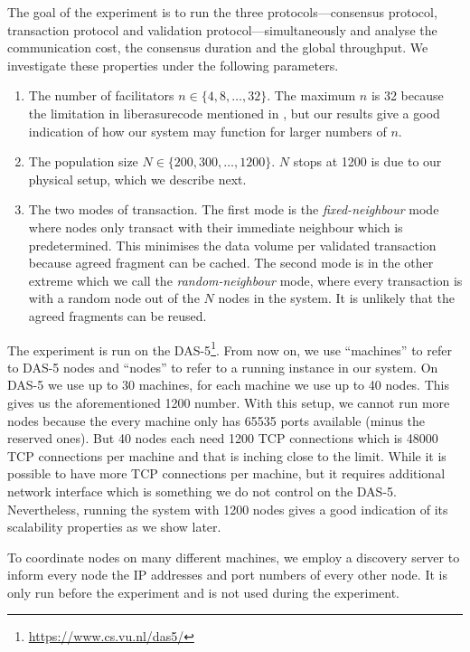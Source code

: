 The goal of the experiment is to run the three protocols---consensus protocol,
transaction protocol and validation protocol---simultaneously and analyse the communication cost, the consensus duration and the global throughput.
We investigate these properties under the following parameters.
\begin{enumerate}
  \item The number of facilitators $n \in \{4, 8, \dots, 32\}$.
        The maximum $n$ is 32 because the limitation in liberasurecode mentioned in ,
        but our results give a good indication of how our system may function for larger numbers of $n$.
  \item The population size $N \in \{200, 300, \dots, 1200\}$.
        $N$ stops at 1200 is due to our physical setup, which we describe next.
  \item The two modes of transaction.
        The first mode is the \emph{fixed-neighbour} mode where nodes only transact with their immediate neighbour which is predetermined. 
        This minimises the data volume per validated transaction because agreed fragment can be cached.
        The second mode is in the other extreme which we call the \emph{random-neighbour} mode,
        where every transaction is with a random node out of the $N$ nodes in the system.
        It is unlikely that the agreed fragments can be reused.
\end{enumerate}

The experiment is run on the DAS-5\footnote{\url{https://www.cs.vu.nl/das5/}}.
From now on, we use ``machines'' to refer to DAS-5 nodes and ``nodes'' to refer to a running instance in our system.
On DAS-5 we use up to 30 machines, for each machine we use up to 40 nodes.
This gives us the aforementioned 1200 number.
With this setup, we cannot run more nodes because the every machine only has 65535 ports available (minus the reserved ones).
But 40 nodes each need 1200 TCP connections which is 48000 TCP connections per machine and that is inching close to the limit.
While it is possible to have more TCP connections per machine,
but it requires additional network interface which is something we do not control on the DAS-5.
Nevertheless, running the system with 1200 nodes gives a good indication of its scalability properties as we show later.

To coordinate nodes on many different machines,
we employ a discovery server to inform every node the IP addresses and port numbers of every other node.
It is only run before the experiment and is not used during the experiment.

